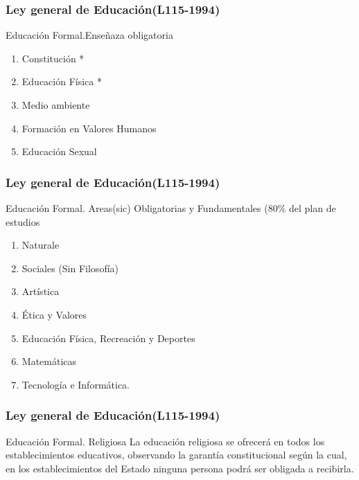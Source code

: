 \documentclass{beamer}
\begin{document}
\begin{frame}
\frametitle{Ley general de Educaci\'on(L115-1994)}
\begin{block}{Educaci\'on Formal.Ense\~naza obligatoria}
 \begin{enumerate}
\item Constituci\'on *  \checkmark
\item  Educaci\'on F\'isica *
\item  Medio ambiente \checkmark
\item Formaci\'on en Valores Humanos \checkmark
\item  Educaci\'on Sexual
\end{enumerate}
\end{block}
\end{frame}

\begin{frame}
\frametitle{Ley general de Educaci\'on(L115-1994)}
\begin{block}{Educaci\'on Formal. Areas(sic) Obligatorias y Fundamentales (80\% del plan de estudios }
 \begin{enumerate}
\item Naturale
\item  Sociales (Sin Filosof\'ia)
\item  Art\'istica
\item \'Etica y Valores
\item  Educaci\'on F\'isica, Recreaci\'on y Deportes
\item Matem\'aticas
\item Tecnolog\'ia e Inform\'atica.  
\end{enumerate}
\end{block}
\end{frame}
\begin{frame}
\frametitle{Ley general de Educaci\'on(L115-1994)}
\begin{block}{Educaci\'on Formal. Religiosa}
La educaci\'on religiosa se ofrecer\'a en todos los establecimientos educativos, observando la garant\'ia constitucional seg\'un la cual, en los establecimientos del Estado ninguna persona podr\'a ser obligada a
recibirla. 
\end{block}
\end{frame}
\end{document}
